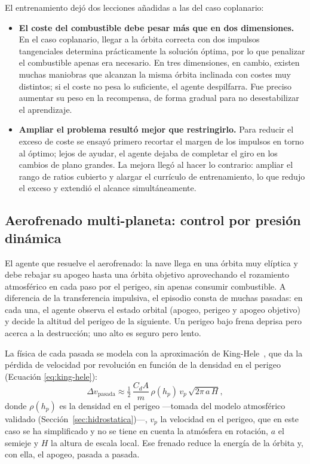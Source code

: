 El entrenamiento dejó dos lecciones añadidas a las del caso coplanario:
\begin{itemize}
  \item \textbf{El coste del combustible debe pesar más que en dos dimensiones.} En el caso coplanario, llegar a la órbita correcta con dos impulsos tangenciales determina prácticamente la solución óptima, por lo que penalizar el combustible apenas era necesario. En tres dimensiones, en cambio, existen muchas maniobras que alcanzan la misma órbita inclinada con costes muy distintos; si el coste no pesa lo suficiente, el agente despilfarra. Fue preciso aumentar su peso en la recompensa, de forma gradual para no desestabilizar el aprendizaje.
  \item \textbf{Ampliar el problema resultó mejor que restringirlo.} Para reducir el exceso de coste se ensayó primero recortar el margen de los impulsos en torno al óptimo; lejos de ayudar, el agente dejaba de completar el giro en los cambios de plano grandes. La mejora llegó al hacer lo contrario: ampliar el rango de ratios cubierto y alargar el currículo de entrenamiento, lo que redujo el exceso y extendió el alcance simultáneamente.
\end{itemize}


\subsection{Aerofrenado multi-planeta: control por presión dinámica}
\label{sec:ia-aerofrenado}

El agente que resuelve el aerofrenado: la nave llega en una órbita muy elíptica y debe rebajar su apogeo hasta una órbita objetivo aprovechando el rozamiento atmosférico en cada paso por el perigeo, sin apenas consumir combustible. A diferencia de la transferencia impulsiva, el episodio consta de muchas pasadas: en cada una, el agente observa el estado orbital (apogeo, perigeo y apogeo objetivo) y
decide la altitud del perigeo de la siguiente. Un perigeo bajo frena deprisa pero acerca a la destrucción; uno alto es seguro pero lento.

La física de cada pasada se modela con la aproximación de King-Hele~\cite{kinghele1987}, que da la pérdida de velocidad por revolución en función de la densidad en el perigeo (Ecuación \ref{eq:king-hele}):
\begin{equation}
  \Delta v_{\text{pasada}} \approx \tfrac{1}{2}\,\frac{C_d A}{m}\,\rho(h_p)\,v_p\,
  \sqrt{2\pi\,a\,H},
  \label{eq:king-hele}
\end{equation}
donde $\rho(h_p)$ es la densidad en el perigeo ---tomada del modelo atmosférico validado (Sección~\ref{sec:hidrostatica})---, $v_p$ la velocidad en el perigeo, que en este caso se ha simplificado y no se tiene en cuenta la atmósfera en rotación, $a$ el semieje y $H$ la altura de escala local. Ese frenado reduce la energía de la órbita y, con ella, el apogeo, pasada a pasada.


